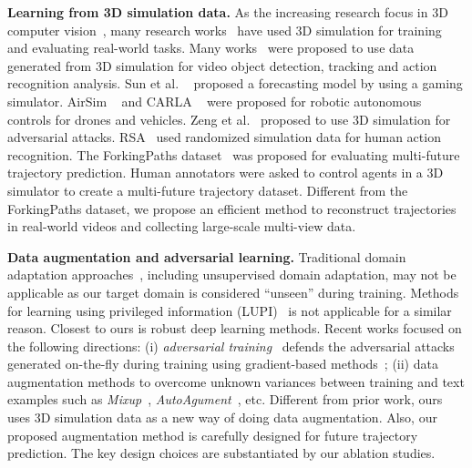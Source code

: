 \documentclass[runningheads]{eccv2020/llncs}
\begin{document}
\noindent\textbf{Learning from 3D simulation data.}
As the increasing research focus in 3D computer vision~\cite{zhang2015fast,liang2017event,shah2018airsim,dosovitskiy2017carla,richter2016playing,ros2016synthia,heess2017emergence}, many research works~\cite{qiu2017unrealcv,gaidon2016virtual,de2017procedural,das2018embodied,wu2019revisiting,zhu2017target,sun2019stochastic,liang2020garden,sun2018multi,bak2018domain} have used 3D simulation for training and evaluating real-world tasks.
Many works~\cite{qiu2017unrealcv,gaidon2016virtual,de2017procedural} were proposed to use data generated from 3D simulation for video object detection, tracking and action recognition analysis. 
Sun et al. ~\cite{sun2019stochastic} proposed a forecasting model by using a gaming simulator.
AirSim ~\cite{shah2018airsim} and CARLA ~\cite{dosovitskiy2017carla} were proposed for robotic autonomous controls for drones and vehicles.
Zeng et al.~\cite{zeng2019adversarial} proposed to use 3D simulation for adversarial attacks. RSA~\cite{zhang2019rsa} used randomized simulation data for human action recognition.
The ForkingPaths dataset~\cite{liang2020garden} was proposed for evaluating multi-future trajectory prediction. Human annotators were asked to control agents in a 3D simulator to create a multi-future trajectory dataset. 
Different from the ForkingPaths dataset, we propose an efficient method to reconstruct trajectories in real-world videos and collecting large-scale multi-view data.






\noindent\textbf{Data augmentation and adversarial learning.}
Traditional domain adaptation approaches~\cite{bousmalis2017unsupervised,ganin2016domain,tzeng2017adversarial,kang2019contrastive}, including unsupervised domain adaptation, may not be applicable as our target domain is considered ``unseen'' during training. Methods for learning using privileged information (LUPI)~\cite{lambert2018deep,vapnik2015learning,lopez2015unifying,luo2018graph} is not applicable for a similar reason. Closest to ours is robust deep learning methods. Recent works focused on the following directions: (i) \textit{adversarial training}~\cite{goodfellow2014explaining,madry2017towards,xie2019feature,zeng2019adversarial} defends the adversarial attacks generated on-the-fly during training using gradient-based methods~\cite{madry2017towards,goodfellow2014explaining,tramer2017ensemble}; (ii) data augmentation methods to overcome unknown variances between training and text examples such as \textit{Mixup}~\cite{zhang2017mixup}, \textit{AutoAgument}~\cite{cubuk2019autoaugment}, etc.
Different from prior work, ours uses 3D simulation data as a new way of doing data augmentation. Also, our proposed augmentation method is carefully designed for future trajectory prediction. The key design choices are substantiated by our ablation studies.
\end{document}
